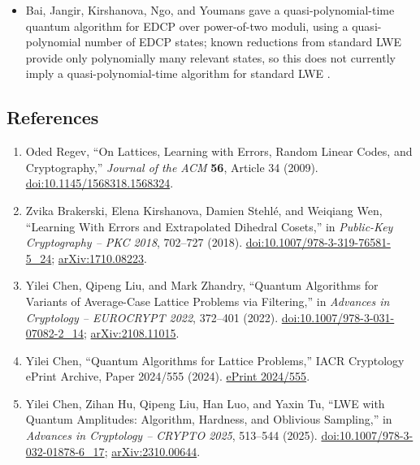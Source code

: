 \begin{itemize}
  \item Bai, Jangir, Kirshanova, Ngo, and Youmans gave a
quasi-polynomial-time quantum algorithm for EDCP over power-of-two moduli,
using a quasi-polynomial number of EDCP states; known reductions from
standard LWE provide only polynomially many relevant states, so this does
not currently imply a quasi-polynomial-time algorithm for standard LWE
.
\end{itemize}

\subsection*{References}

\begin{enumerate}[label={},leftmargin=4.8em,labelsep=0.5em]
  \footnotesize
  \item[\textup{[Reg09]}]\label{ref:3596-regev}
  Oded Regev, ``On Lattices, Learning with Errors, Random Linear Codes, and
Cryptography,'' \emph{Journal of the ACM} \textbf{56}, Article 34 (2009).
\href{https://doi.org/10.1145/1568318.1568324}{doi:10.1145/1568318.1568324}.

  \item[\textup{[BKSW18]}]\label{ref:3596-bksw}
  Zvika Brakerski, Elena Kirshanova, Damien Stehl\'e, and Weiqiang Wen,
``Learning With Errors and Extrapolated Dihedral Cosets,'' in \emph{Public-Key
Cryptography -- PKC 2018}, 702--727 (2018).
\href{https://doi.org/10.1007/978-3-319-76581-5_24}{doi:10.1007/978-3-319-76581-5_24};
\href{https://arxiv.org/abs/1710.08223}{arXiv:1710.08223}.

  \item[\textup{[CLZ22]}]\label{ref:3596-clz}
  Yilei Chen, Qipeng Liu, and Mark Zhandry, ``Quantum Algorithms for
Variants of Average-Case Lattice Problems via Filtering,'' in \emph{Advances
in Cryptology -- EUROCRYPT 2022}, 372--401 (2022).
\href{https://doi.org/10.1007/978-3-031-07082-2_14}{doi:10.1007/978-3-031-07082-2_14};
\href{https://arxiv.org/abs/2108.11015}{arXiv:2108.11015}.

  \item[\textup{[Che24]}]\label{ref:3596-chen24}
  Yilei Chen, ``Quantum Algorithms for Lattice Problems,'' IACR Cryptology
ePrint Archive, Paper 2024/555 (2024).
\href{https://eprint.iacr.org/2024/555}{ePrint 2024/555}.

  \item[\textup{[CHLLT25]}]\label{ref:3596-chllt}
  Yilei Chen, Zihan Hu, Qipeng Liu, Han Luo, and Yaxin Tu, ``LWE with
Quantum Amplitudes: Algorithm, Hardness, and Oblivious Sampling,'' in
\emph{Advances in Cryptology -- CRYPTO 2025}, 513--544 (2025).
\href{https://doi.org/10.1007/978-3-032-01878-6_17}{doi:10.1007/978-3-032-01878-6_17};
\href{https://arxiv.org/abs/2310.00644}{arXiv:2310.00644}.


\end{enumerate}
